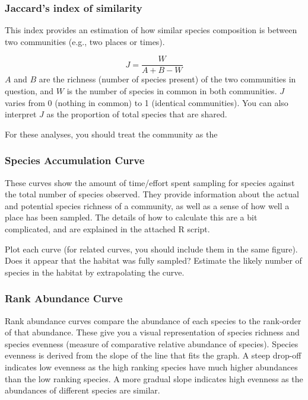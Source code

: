 \documentclass[]{book}
\begin{document}
\subsubsection{Jaccard's index of
similarity}\label{jaccards-index-of-similarity}

This index provides an estimation of how similar species composition is
between two communities (e.g., two places or times).

\[J = \frac{W}{A + B - W}\] \(A\) and \(B\) are the richness (number of
species present) of the two communities in question, and \(W\) is the
number of species in common in both communities. \(J\) varies from 0
(nothing in common) to 1 (identical communities). You can also interpret
\(J\) as the proportion of total species that are shared.

For these analyses, you should treat the community as the

\subsubsection{Species Accumulation
Curve}\label{species-accumulation-curve}

These curves show the amount of time/effort spent sampling for species
against the total number of species observed. They provide information
about the actual and potential species richness of a community, as well
as a sense of how well a place has been sampled. The details of how to
calculate this are a bit complicated, and are explained in the attached
R script.

Plot each curve (for related curves, you should include them in the same
figure). Does it appear that the habitat was fully sampled? Estimate the
likely number of species in the habitat by extrapolating the curve.

\subsubsection{Rank Abundance Curve}\label{rank-abundance-curve}

Rank abundance curves compare the abundance of each species to the
rank-order of that abundance. These give you a visual representation of
species richness and species evenness (measure of comparative relative
abundance of species). Species evenness is derived from the slope of the
line that fits the graph. A steep drop-off indicates low evenness as the
high ranking species have much higher abundances than the low ranking
species. A more gradual slope indicates high evenness as the abundances
of different species are similar.
\end{document}
